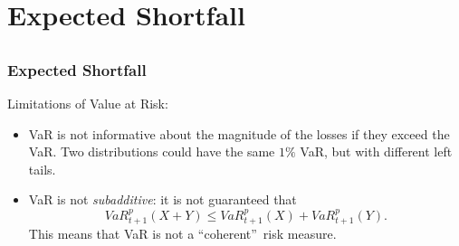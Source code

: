 \section{Expected Shortfall}\subsection*{}

\begin{frame}%

\frametitle{Expected Shortfall}

Limitations of Value at Risk:

\begin{itemize}
\item VaR is not informative about the magnitude of the losses if they
exceed the VaR. Two distributions could have the same $1\%$ VaR, but with
different left tails.

\item VaR is not \emph{\color{red}subadditive}: it is not guaranteed that
\begin{equation*}
VaR_{t+1}^{p}(X+Y)\leq VaR_{t+1}^{p}(X)+VaR_{t+1}^{p}(Y).
\end{equation*}
This means that VaR is not a \textquotedblleft coherent\textquotedblright\
risk measure.
\end{itemize}

\end{frame}%

